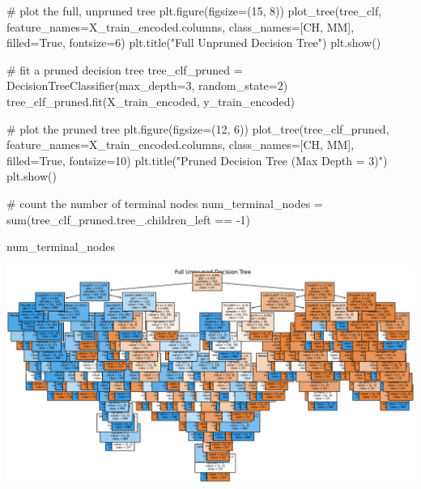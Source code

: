 \documentclass[
  letterpaper,
  DIV=11,
  numbers=noendperiod]{scrartcl}
\newenvironment{Shaded}{\begin{snugshade}}{\end{snugshade}}
\newcommand{\BuiltInTok}[1]{\textcolor[rgb]{0.00,0.23,0.31}{#1}}
\newcommand{\CommentTok}[1]{\textcolor[rgb]{0.37,0.37,0.37}{#1}}
\newcommand{\DecValTok}[1]{\textcolor[rgb]{0.68,0.00,0.00}{#1}}
\newcommand{\NormalTok}[1]{\textcolor[rgb]{0.00,0.23,0.31}{#1}}
\newcommand{\OperatorTok}[1]{\textcolor[rgb]{0.37,0.37,0.37}{#1}}
\newcommand{\StringTok}[1]{\textcolor[rgb]{0.13,0.47,0.30}{#1}}
\newcommand{\VariableTok}[1]{\textcolor[rgb]{0.07,0.07,0.07}{#1}}
\begin{document}
\begin{Shaded}
\begin{Highlighting}[]
\CommentTok{\# plot the full, unpruned tree}
\NormalTok{plt.figure(figsize}\OperatorTok{=}\NormalTok{(}\DecValTok{15}\NormalTok{, }\DecValTok{8}\NormalTok{))}
\NormalTok{plot\_tree(tree\_clf, feature\_names}\OperatorTok{=}\NormalTok{X\_train\_encoded.columns,}
\NormalTok{          class\_names}\OperatorTok{=}\NormalTok{[}\StringTok{\textquotesingle{}CH\textquotesingle{}}\NormalTok{, }\StringTok{\textquotesingle{}MM\textquotesingle{}}\NormalTok{], filled}\OperatorTok{=}\VariableTok{True}\NormalTok{, fontsize}\OperatorTok{=}\DecValTok{6}\NormalTok{)}
\NormalTok{plt.title(}\StringTok{"Full Unpruned Decision Tree"}\NormalTok{)}
\NormalTok{plt.show()}

\CommentTok{\# fit a pruned decision tree}
\NormalTok{tree\_clf\_pruned }\OperatorTok{=}\NormalTok{ DecisionTreeClassifier(max\_depth}\OperatorTok{=}\DecValTok{3}\NormalTok{, random\_state}\OperatorTok{=}\DecValTok{2}\NormalTok{)}
\NormalTok{tree\_clf\_pruned.fit(X\_train\_encoded, y\_train\_encoded)}

\CommentTok{\# plot the pruned tree}
\NormalTok{plt.figure(figsize}\OperatorTok{=}\NormalTok{(}\DecValTok{12}\NormalTok{, }\DecValTok{6}\NormalTok{))}
\NormalTok{plot\_tree(tree\_clf\_pruned, feature\_names}\OperatorTok{=}\NormalTok{X\_train\_encoded.columns,}
\NormalTok{          class\_names}\OperatorTok{=}\NormalTok{[}\StringTok{\textquotesingle{}CH\textquotesingle{}}\NormalTok{, }\StringTok{\textquotesingle{}MM\textquotesingle{}}\NormalTok{], filled}\OperatorTok{=}\VariableTok{True}\NormalTok{, fontsize}\OperatorTok{=}\DecValTok{10}\NormalTok{)}
\NormalTok{plt.title(}\StringTok{"Pruned Decision Tree (Max Depth = 3)"}\NormalTok{)}
\NormalTok{plt.show()}

\CommentTok{\# count the number of terminal nodes}
\NormalTok{num\_terminal\_nodes }\OperatorTok{=} \BuiltInTok{sum}\NormalTok{(tree\_clf\_pruned.tree\_.children\_left }\OperatorTok{==} \OperatorTok{{-}}\DecValTok{1}\NormalTok{)}

\NormalTok{num\_terminal\_nodes}
\end{Highlighting}
\end{Shaded}

\includegraphics{PS4_files/figure-pdf/cell-13-output-1.pdf}
\end{document}
